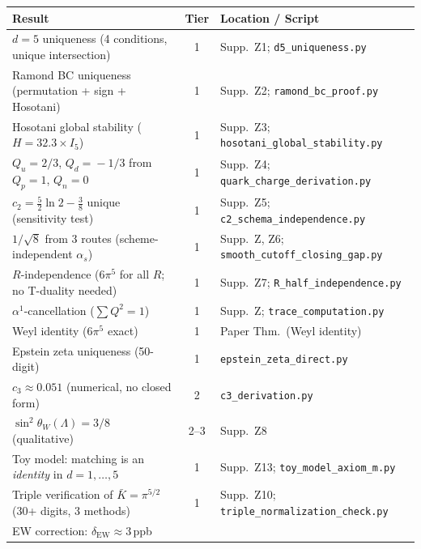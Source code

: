 \documentclass[11pt,a4paper]{article}
\begin{document}
\begin{center}
\renewcommand{\arraystretch}{1.15}\small
\begin{tabular}{>{\raggedright}p{5.5cm}cp{5.5cm}}
\toprule
\textbf{Result} & \textbf{Tier} & \textbf{Location / Script}\\
\midrule
\rowcolor{tier1}
$d=5$ uniqueness (4 conditions, unique intersection)
  & 1 & Supp.\ Z1; \texttt{d5\_uniqueness.py}\\
\rowcolor{tier1}
Ramond BC uniqueness (permutation + sign + Hosotani)
  & 1 & Supp.\ Z2; \texttt{ramond\_bc\_proof.py}\\
\rowcolor{tier1}
Hosotani global stability ($H=32.3\times I_5$)
  & 1 & Supp.\ Z3; \texttt{hosotani\_global\_stability.py}\\
\rowcolor{tier1}
$Q_u\!=\!2/3$, $Q_d\!=\!-1/3$ from $Q_p\!=\!1$, $Q_n\!=\!0$
  & 1 & Supp.\ Z4; \texttt{quark\_charge\_derivation.py}\\
\rowcolor{tier1}
$c_2=\tfrac52\ln 2-\tfrac38$ unique (sensitivity test)
  & 1 & Supp.\ Z5; \texttt{c2\_schema\_independence.py}\\
\rowcolor{tier1}
$1/\!\sqrt{8}$ from 3 routes (scheme-independent $\alpha_s$)
  & 1 & Supp.\ Z, Z6; \texttt{smooth\_cutoff\_closing\_gap.py}\\
\rowcolor{tier1}
$R$-independence ($6\pi^5$ for all $R$; no T-duality needed)
  & 1 & Supp.\ Z7; \texttt{R\_half\_independence.py}\\
\rowcolor{tier1}
$\alpha^1$-cancellation ($\sum Q^2=1$)
  & 1 & Supp.\ Z; \texttt{trace\_computation.py}\\
\rowcolor{tier1}
Weyl identity ($6\pi^5$ exact)
  & 1 & Paper Thm.\ (Weyl identity)\\
\rowcolor{tier1}
Epstein zeta uniqueness (50-digit)
  & 1 & \texttt{epstein\_zeta\_direct.py}\\
\midrule
\rowcolor{tier2}
$c_3\approx 0.051$ (numerical, no closed form)
  & 2 & \texttt{c3\_derivation.py}\\
\rowcolor{tier2}
$\sin^2\theta_W(\Lambda)=3/8$ (qualitative)
  & 2--3 & Supp.\ Z8\\
\midrule
\rowcolor{tier1}
Toy model: matching is an \emph{identity} in $d=1,\ldots,5$
  & 1 & Supp.\ Z13; \texttt{toy\_model\_axiom\_m.py}\\
\rowcolor{tier1}
Triple verification of $\bar K=\pi^{5/2}$ (30+ digits, 3 methods)
  & 1 & Supp.\ Z10; \texttt{triple\_normalization\_check.py}\\
\rowcolor{tier2}
EW correction: $\delta_{\mathrm{EW}}\approx 3\,$ppb

\end{tabular}
\end{center}
\end{document}

